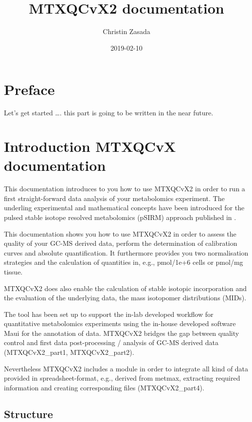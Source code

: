 \documentclass[]{book}
\title{MTXQCvX2 documentation}
\author{Christin Zasada}
\date{2019-02-10}
\theoremstyle{definition}
\theoremstyle{definition}
\theoremstyle{definition}
\theoremstyle{remark}
\begin{document}
\maketitle

{
\setcounter{tocdepth}{1}
\tableofcontents
}
\chapter{Preface}\label{preface}

Let's get started \ldots{}. this part is going to be written in the near
future.

\chapter{Introduction MTXQCvX documentation}\label{intro}

This documentation introduces to you how to use MTXQCvX2 in order to run
a first straight-forward data analysis of your metabolomics experiment.
The underling experimental and mathematical concepts have been
introduced for the pulsed stable isotope resolved metabolomics (pSIRM)
approach published in \citep{Pietzke2014}.

This documentation shows you how to use MTXQCvX2 in order to assess the
quality of your GC-MS derived data, perform the determination of
calibration curves and absolute quantification. It furthermore provides
you two normalisation strategies and the calculation of quantities in,
e.g., pmol/1e+6 cells or pmol/mg tissue.

MTXQCvX2 does also enable the calculation of stable isotopic
incorporation and the evaluation of the underlying data, the mass
isotopomer distributions (MIDs).

The tool has been set up to support the in-lab developed workflow for
quantitative metabolomics experiments using the in-house developed
software Maui for the annotation of data. MTXQCvX2 bridges the gap
between quality control and first data post-processing / analysis of
GC-MS derived data (MTXQCvX2\_part1, MTXQCvX2\_part2).

Nevertheless MTXQCvX2 includes a module in order to integrate all kind
of data provided in spreadsheet-format, e.g., derived from metmax,
extracting required information and creating corresponding files
(MTXQCvX2\_part4).

\section{Structure}\label{structure}
\end{document}
